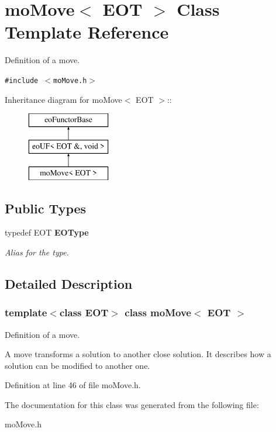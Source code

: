 \section{moMove$<$ EOT $>$ Class Template Reference}
\label{classmo_move}
Definition of a move.  


{\tt \#include $<$moMove.h$>$}

Inheritance diagram for moMove$<$ EOT $>$::\begin{figure}[H]
\begin{center}
\leavevmode
\includegraphics[height=3cm]{classmo_move}
\end{center}
\end{figure}
\subsection*{Public Types}
\begin{CompactItemize}
\item 
typedef EOT {\bf EOType}\label{classmo_move_7fb853a91ba1319530529e515380bbba}

\begin{CompactList}\small\item\em Alias for the type. \item\end{CompactList}\end{CompactItemize}


\subsection{Detailed Description}
\subsubsection*{template$<$class EOT$>$ class moMove$<$ EOT $>$}

Definition of a move. 

A move transforms a solution to another close solution. It describes how a solution can be modified to another one. 



Definition at line 46 of file moMove.h.

The documentation for this class was generated from the following file:\begin{CompactItemize}
\item 
moMove.h\end{CompactItemize}
